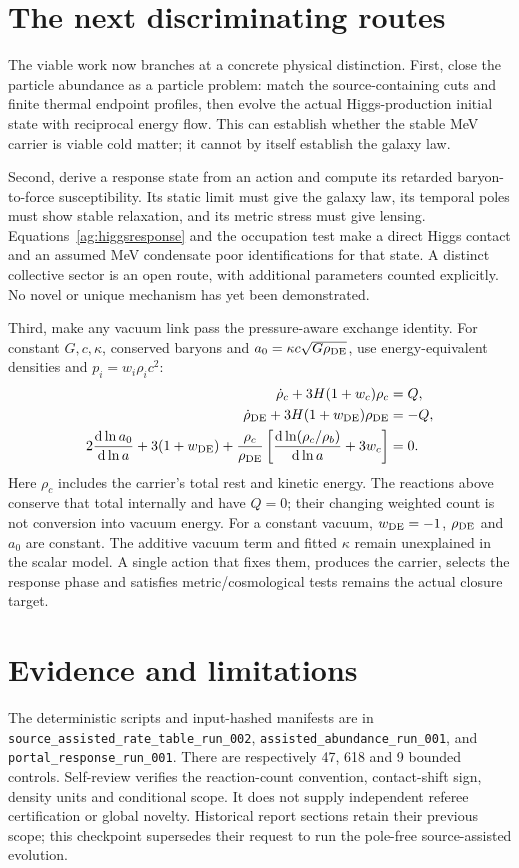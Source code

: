 \documentclass[11pt]{article}
\newcommand{\dd}{\mathrm d}
\begin{document}
\section{The next discriminating routes}
The viable work now branches at a concrete physical distinction.
First, close the particle abundance as a particle problem: match the
source-containing cuts and finite thermal endpoint profiles, then evolve
the actual Higgs-production initial state with reciprocal energy flow.
This can establish whether the stable MeV carrier is viable cold matter;
it cannot by itself establish the galaxy law.

Second, derive a response state from an action and compute its retarded
baryon-to-force susceptibility. Its static limit must give the galaxy
law, its temporal poles must show stable relaxation, and its metric stress
must give lensing. Equations~\eqref{ag:higgsresponse} and the occupation
test make a direct Higgs contact and an assumed MeV condensate poor
identifications for that state. A distinct collective sector is an open
route, with additional parameters counted explicitly. No novel or unique
mechanism has yet been demonstrated.

Third, make any vacuum link pass the pressure-aware exchange identity.
For constant $G,c,\kappa$, conserved baryons and $a_0=\kappa c
\sqrt{G\rho_{\rm DE}}$, use energy-equivalent densities and
$p_i=w_i\rho_i c^2$:
\begin{align}
 \dot\rho_c+3H(1+w_c)\rho_c&=Q,\\
 \dot\rho_{\rm DE}+3H(1+w_{\rm DE})\rho_{\rm DE}&=-Q,\\
 2{\dd\ln a_0\over\dd\ln a}+3(1+w_{\rm DE})
 +{\rho_c\over\rho_{\rm DE}}
 \left[{\dd\ln(\rho_c/\rho_b)\over\dd\ln a}+3w_c\right]&=0.
\end{align}
Here $\rho_c$ includes the carrier's total rest and kinetic energy.
The reactions above conserve that total internally and have $Q=0$;
their changing weighted count is not conversion into vacuum energy.
For a constant vacuum, $w_{\rm DE}=-1$, $\rho_{\rm DE}$ and $a_0$
are constant. The additive vacuum term and fitted $\kappa$ remain
unexplained in the scalar model. A single action that fixes them, produces
the carrier, selects the response phase and satisfies metric/cosmological
tests remains the actual closure target.

\section{Evidence and limitations}
The deterministic scripts and input-hashed manifests are in
\texttt{source\_assisted\_rate\_table\_run\_002},
\texttt{assisted\_abundance\_run\_001}, and
\texttt{portal\_response\_run\_001}. There are respectively 47, 618
and 9 bounded controls. Self-review verifies the reaction-count convention,
contact-shift sign, density units and conditional scope. It does not supply
independent referee certification or global novelty. Historical report
sections retain their previous scope; this checkpoint supersedes their
request to run the pole-free source-assisted evolution.
\end{document}
